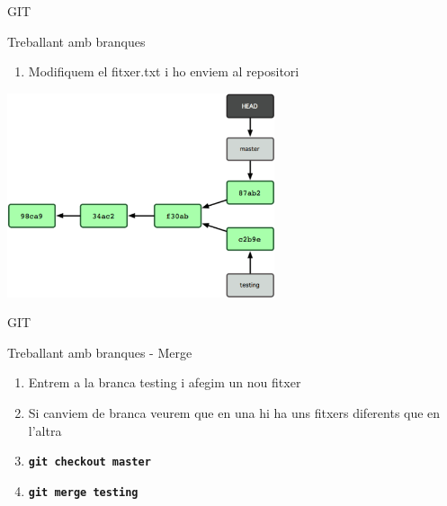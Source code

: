 \documentclass[10pt,xcolor={rgb}]{beamer}
\begin{document}
    \begin{frame}[fragile]{GIT}
      \begin{block}{Treballant amb branques}

        \begin{enumerate}
          \item Modifiquem el fitxer.txt i ho enviem al repositori
        \end{enumerate}

        \centering
        \includegraphics[height=6cm]{b5.png}

      \end{block}
    \end{frame}

    \begin{frame}[fragile]{GIT}
      \begin{block}{Treballant amb branques - Merge}

        \begin{enumerate}
          \item Entrem a la branca testing i afegim un nou fitxer
          \item Si canviem de branca veurem que en una hi ha uns fitxers diferents que en l'altra
          \item \texttt{\textbf{git checkout master}}
          \item \texttt{\textbf{git merge testing}}
        \end{enumerate}

      \end{block}
    \end{frame}
\end{document}
